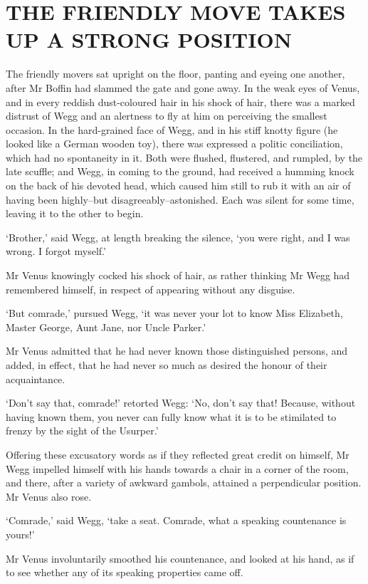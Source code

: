 
\chapter{THE FRIENDLY MOVE TAKES UP A STRONG POSITION}

The friendly movers sat upright on the floor, panting and eyeing one
another, after Mr Boffin had slammed the gate and gone away. In the weak
eyes of Venus, and in every reddish dust-coloured hair in his shock of
hair, there was a marked distrust of Wegg and an alertness to fly at him
on perceiving the smallest occasion. In the hard-grained face of Wegg,
and in his stiff knotty figure (he looked like a German wooden toy),
there was expressed a politic conciliation, which had no spontaneity in
it. Both were flushed, flustered, and rumpled, by the late scuffle; and
Wegg, in coming to the ground, had received a humming knock on the back
of his devoted head, which caused him still to rub it with an air of
having been highly--but disagreeably--astonished. Each was silent for
some time, leaving it to the other to begin.

‘Brother,’ said Wegg, at length breaking the silence, ‘you were right,
and I was wrong. I forgot myself.’

Mr Venus knowingly cocked his shock of hair, as rather thinking Mr Wegg
had remembered himself, in respect of appearing without any disguise.

‘But comrade,’ pursued Wegg, ‘it was never your lot to know Miss
Elizabeth, Master George, Aunt Jane, nor Uncle Parker.’

Mr Venus admitted that he had never known those distinguished persons,
and added, in effect, that he had never so much as desired the honour of
their acquaintance.

‘Don’t say that, comrade!’ retorted Wegg: ‘No, don’t say that! Because,
without having known them, you never can fully know what it is to be
stimilated to frenzy by the sight of the Usurper.’

Offering these excusatory words as if they reflected great credit on
himself, Mr Wegg impelled himself with his hands towards a chair in
a corner of the room, and there, after a variety of awkward gambols,
attained a perpendicular position. Mr Venus also rose.

‘Comrade,’ said Wegg, ‘take a seat. Comrade, what a speaking countenance
is yours!’

Mr Venus involuntarily smoothed his countenance, and looked at his hand,
as if to see whether any of its speaking properties came off.

